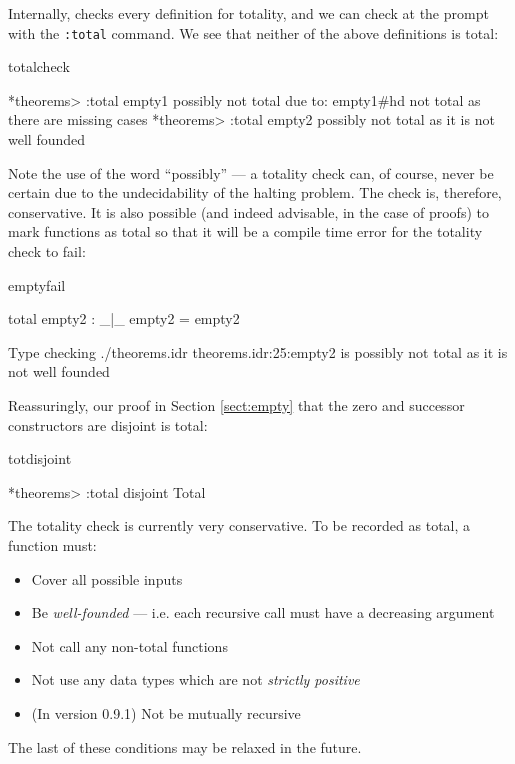 \noindent
Internally, \Idris{} checks every definition for totality, and we can check at the prompt
with the \texttt{:total} command. We see that neither of the above definitions is total:

\begin{SaveVerbatim}{totalcheck}

*theorems> :total empty1
possibly not total due to: empty1#hd
	not total as there are missing cases
*theorems> :total empty2
possibly not total as it is not well founded

\end{SaveVerbatim}

\noindent
Note the use of the word ``possibly'' --- a totality check can, of course, never be certain
due to the undecidability of the halting problem. The check is, therefore, conservative.
It is also possible (and indeed advisable, in the case of proofs) to mark functions as
total so that it will be a compile time error for the totality check to fail:

\begin{SaveVerbatim}{emptyfail}

total empty2 : _|_
empty2 = empty2

Type checking ./theorems.idr
theorems.idr:25:empty2 is possibly not total as it is not well founded

\end{SaveVerbatim}

\noindent
Reassuringly, our proof in Section \ref{sect:empty} that the zero and successor constructors
are disjoint is total:

\begin{SaveVerbatim}{totdisjoint}

*theorems> :total disjoint
Total

\end{SaveVerbatim}

\noindent
The totality check is currently very conservative. To be recorded as total, a function must:

\begin{itemize}
\item Cover all possible inputs
\item Be \emph{well-founded} --- i.e. each recursive call must have a decreasing argument
\item Not call any non-total functions
\item Not use any data types which are not \emph{strictly positive}
\item (In version 0.9.1) Not be mutually recursive
\end{itemize}

\noindent
The last of these conditions may be relaxed in the future.
